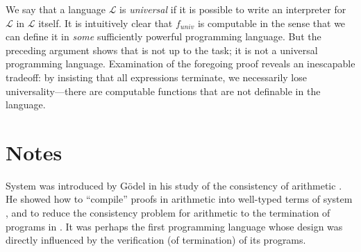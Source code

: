 We say that a language $\mathcal{L}$ is \emph{universal} if it is possible to
write an interpreter for $\mathcal{L}$ in $\mathcal{L}$ itself.  It is
intuitively clear that $f_{\textit{univ}}$ is computable in the sense that we
can define it in \emph{some} sufficiently powerful programming language.  But
the preceding argument shows that \LangT{} is not up to the task; it is not
a universal programming language.  Examination of the foregoing proof reveals an
inescapable tradeoff: by insisting that all expressions terminate, we
necessarily lose universality---there are computable functions that are not
definable in the language.

\section{Notes}

System \LangT{} was introduced by G\"{o}del in his study of the
consistency of arithmetic \citep{goedel:t}.  He showed how to
``compile'' proofs in arithmetic into well-typed terms of system
\LangT{}, and to reduce the consistency problem for arithmetic to the
termination of programs in \LangT{}.  It was perhaps the first
programming language whose design was directly influenced by the
verification (of termination) of its programs.

